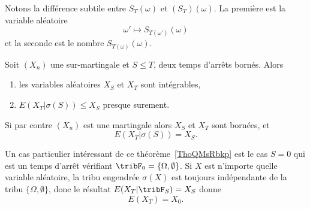 \begin{remark}
	Notons la différence subtile entre \( S_T(\omega)\) et \( (S_T)(\omega)\). La première est la variable aléatoire
	\begin{equation}
		\omega'\mapsto S_{T(\omega')}(\omega)
	\end{equation}
	et la seconde est le nombre \( S_{T(\omega)}(\omega)\).
\end{remark}

\begin{theorem}   \label{ThoQMsRbkp}
	Soit \( (X_n)\) une sur-martingale et \( S\leq T\), deux temps d'arrêts bornés. Alors
	\begin{enumerate}
		\item
		      les variables aléatoires \( X_{S}\) et \( X_{T}\) sont intégrables,
		\item
		      \( E(X_{T}|  \sigma(S) )\leq X_{S}\) presque surement.
	\end{enumerate}
	Si par contre \( (X_n)\) est une martingale alors \( X_{S}\) et \( X_{T}\) sont bornées, et
	\begin{equation}
		E(X_{T}|\sigma(S))=X_{S}.
	\end{equation}
\end{theorem}
\begin{remark}  \label{RemKCdpnid}
	Un cas particulier intéressant de ce théorème~\ref{ThoQMsRbkp} est le cas \( S=0\) qui est un temps d'arrêt vérifiant \( \tribF_0=\{ \Omega,\emptyset \}\). Si \( X\) est n'importe quelle variable aléatoire, la tribu engendrée \( \sigma(X)\) est toujours indépendante de la tribu \( \{ \Omega,\emptyset \}\), donc le résultat \( E(X_T|\tribF_S)=X_S\) donne
	\begin{equation}
		E(X_T)=X_0.
	\end{equation}
\end{remark}

